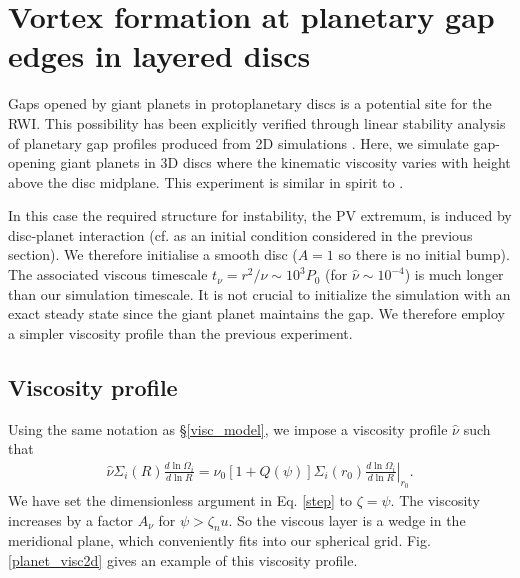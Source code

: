 \section{Vortex formation at planetary gap edges in layered discs}
Gaps opened by giant planets in protoplanetary discs is a potential site for 
the RWI. This possibility has been explicitly verified through 
linear stability analysis of planetary gap profiles 
produced from 2D simulations \citep{valborro07,lin10}. Here, we
simulate gap-opening giant planets in 3D discs where the kinematic viscosity  
varies with height above the disc midplane. This experiment is similar
in spirit to \cite{pierens10}. 

In this case the required structure for instability, the PV extremum, 
is induced by disc-planet interaction (cf. as an initial condition considered in the
previous section). We therefore initialise a
smooth disc ($A=1$ so there is no initial bump). The associated viscous timescale
$t_\nu=r^2/\nu\sim 10^3P_0$ (for $\hat{\nu}\sim 10^{-4}$) is much
longer than our simulation timescale. It is not crucial to initialize
the simulation with an exact steady state since the giant planet
maintains the gap. We therefore employ a simpler viscosity profile than
the previous experiment.   

\subsection{Viscosity profile}\label{planet_visc_mode}
Using the same notation as \S\ref{visc_model}, we impose a viscosity
profile $\hat{\nu}$ such that 
\begin{align}\label{planet_visc_profile}
  \hat{\nu}\Sigma_i(R)\frac{d\ln{\Omega_i}}{d\ln{R}} =
  \hat{\nu}_0\left[1+Q(\psi)\right]\Sigma_i(r_0)\left.\frac{d\ln{\Omega_i}}{d\ln{R}}\right|_{r_0}.      
\end{align}
We have set the dimensionless argument in Eq. \ref{step} to
$\zeta=\psi$. The viscosity increases by a factor $A_\nu$ for 
$\psi > \zeta_nu$. So the viscous layer is 
a wedge in the meridional plane, which conveniently fits into our
spherical grid. Fig. \ref{planet_visc2d} gives an example of this
viscosity profile.  

